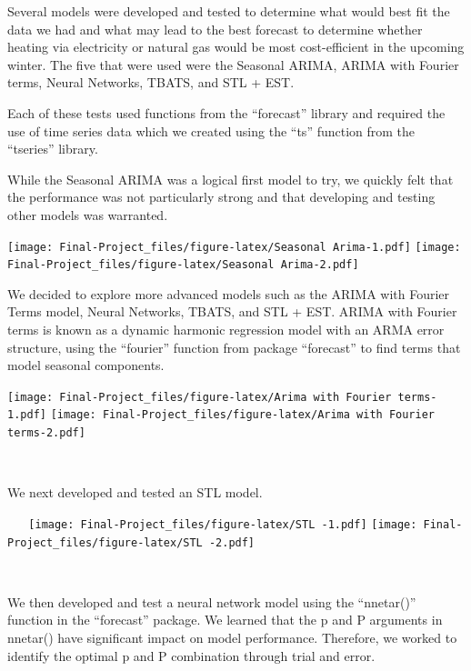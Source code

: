 \documentclass[
]{article}
\begin{document}
Several models were developed and tested to determine what would best
fit the data we had and what may lead to the best forecast to determine
whether heating via electricity or natural gas would be most
cost-efficient in the upcoming winter. The five that were used were the
Seasonal ARIMA, ARIMA with Fourier terms, Neural Networks, TBATS, and
STL + EST.

Each of these tests used functions from the ``forecast'' library and
required the use of time series data which we created using the ``ts''
function from the ``tseries'' library.

While the Seasonal ARIMA was a logical first model to try, we quickly
felt that the performance was not particularly strong and that
developing and testing other models was warranted.

\texttt{[image: Final-Project\_files/figure-latex/Seasonal Arima-1.pdf]}
\texttt{[image: Final-Project\_files/figure-latex/Seasonal Arima-2.pdf]}

We decided to explore more advanced models such as the ARIMA with
Fourier Terms model, Neural Networks, TBATS, and STL + EST. ARIMA with
Fourier terms is known as a dynamic harmonic regression model with an
ARMA error structure, using the ``fourier'' function from package
``forecast'' to find terms that model seasonal components.

\texttt{[image: Final-Project\_files/figure-latex/Arima with Fourier terms-1.pdf]}
\texttt{[image: Final-Project\_files/figure-latex/Arima with Fourier terms-2.pdf]}

~ ~

We next developed and tested an STL model.

~ ~ \texttt{[image: Final-Project\_files/figure-latex/STL -1.pdf]}
\texttt{[image: Final-Project\_files/figure-latex/STL -2.pdf]}

~ ~

We then developed and test a neural network model using the ``nnetar()''
function in the ``forecast'' package. We learned that the p and P
arguments in nnetar() have significant impact on model performance.
Therefore, we worked to identify the optimal p and P combination through
trial and error.

~ ~
\end{document}
